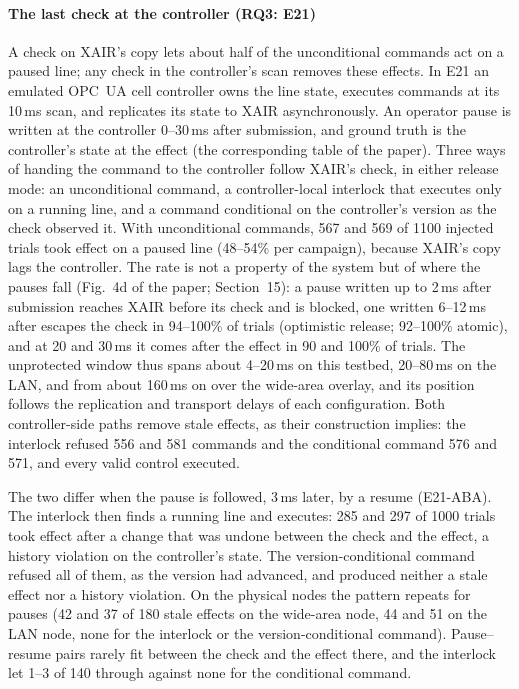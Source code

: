 \documentclass[11pt]{article}
\begin{document}
\paragraph{The last check at the controller (RQ3: E21)}
A check on XAIR's copy lets about half of the unconditional commands act on a paused line; any check in the controller's scan removes these effects. In E21 an emulated OPC~UA cell controller owns the line state, executes commands at its 10\,ms scan, and replicates its state to XAIR asynchronously. An operator pause is written at the controller 0--30\,ms after submission, and ground truth is the controller's state at the effect (the corresponding table of the paper). Three ways of handing the command to the controller follow XAIR's check, in either release mode: an unconditional command, a controller-local interlock that executes only on a running line, and a command conditional on the controller's version as the check observed it. With unconditional commands, 567 and 569 of 1100 injected trials took effect on a paused line (48--54\% per campaign), because XAIR's copy lags the controller. The rate is not a property of the system but of where the pauses fall (Fig.~4d of the paper; Section~15): a pause written up to 2\,ms after submission reaches XAIR before its check and is blocked, one written 6--12\,ms after escapes the check in 94--100\% of trials (optimistic release; 92--100\% atomic), and at 20 and 30\,ms it comes after the effect in 90 and 100\% of trials. The unprotected window thus spans about 4--20\,ms on this testbed, 20--80\,ms on the LAN, and from about 160\,ms on over the wide-area overlay, and its position follows the replication and transport delays of each configuration. Both controller-side paths remove stale effects, as their construction implies: the interlock refused 556 and 581 commands and the conditional command 576 and 571, and every valid control executed.

The two differ when the pause is followed, 3\,ms later, by a resume (E21-ABA). The interlock then finds a running line and executes: 285 and 297 of 1000 trials took effect after a change that was undone between the check and the effect, a history violation on the controller's state. The version-conditional command refused all of them, as the version had advanced, and produced neither a stale effect nor a history violation. On the physical nodes the pattern repeats for pauses (42 and 37 of 180 stale effects on the wide-area node, 44 and 51 on the LAN node, none for the interlock or the version-conditional command). Pause--resume pairs rarely fit between the check and the effect there, and the interlock let 1--3 of 140 through against none for the conditional command.
\end{document}
